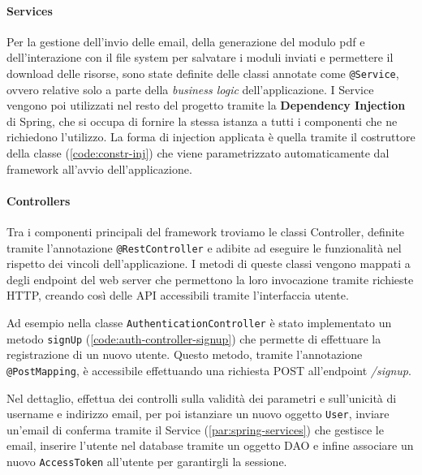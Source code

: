 \paragraph{Services} \label{par:spring-services}
Per la gestione dell'invio delle email, della generazione del modulo pdf e
dell'interazione con il file system per salvatare i moduli inviati e permettere
il download delle risorse, sono state definite delle classi annotate come
\texttt{@Service}, ovvero relative solo a parte della \textit{business logic}
dell'applicazione. I Service vengono poi utilizzati nel resto del progetto
tramite la \textbf{Dependency Injection} di Spring, che si occupa di fornire la
stessa istanza a tutti i componenti che ne richiedono l'utilizzo. La forma di
injection applicata è quella tramite il costruttore della classe 
(\ref{code:constr-inj}) che viene parametrizzato automaticamente dal framework
all'avvio dell'applicazione.



\paragraph{Controllers}
Tra i componenti principali del framework troviamo le classi Controller, definite
tramite l'annotazione \texttt{@RestController} e adibite ad eseguire le funzionalità
nel rispetto dei vincoli dell'applicazione. I metodi di queste classi vengono
mappati a degli endpoint del web server che permettono la loro invocazione tramite
richieste HTTP, creando così delle API accessibili tramite l'interfaccia utente.

Ad esempio nella classe \texttt{AuthenticationController} è stato implementato un
metodo \texttt{signUp} (\ref{code:auth-controller-signup}) che permette di
effettuare la registrazione di un nuovo utente. Questo metodo, tramite
l'annotazione \texttt{@PostMapping}, è accessibile effettuando una richiesta POST
all'endpoint \textit{/signup}.

Nel dettaglio, effettua dei controlli sulla validità dei parametri e sull'unicità
di username e indirizzo email, per poi istanziare un nuovo oggetto \texttt{User},
inviare un'email di conferma tramite il Service (\autoref{par:spring-services})
che gestisce le email, inserire l'utente nel database tramite un oggetto DAO e
infine associare un nuovo \texttt{AccessToken} all'utente per garantirgli la sessione.

